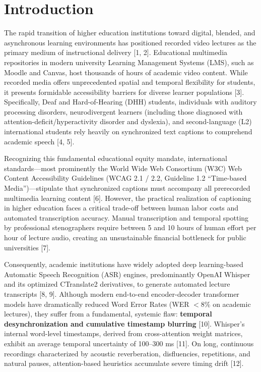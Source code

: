 \documentclass[12pt,a4paper]{article}
\begin{document}
\section{Introduction}
The rapid transition of higher education institutions toward digital, blended, and asynchronous learning environments has positioned recorded video lectures as the primary medium of instructional delivery [1, 2]. Educational multimedia repositories in modern university Learning Management Systems (LMS), such as Moodle and Canvas, host thousands of hours of academic video content. While recorded media offers unprecedented spatial and temporal flexibility for students, it presents formidable accessibility barriers for diverse learner populations [3]. Specifically, Deaf and Hard-of-Hearing (DHH) students, individuals with auditory processing disorders, neurodivergent learners (including those diagnosed with attention-deficit/hyperactivity disorder and dyslexia), and second-language (L2) international students rely heavily on synchronized text captions to comprehend academic speech [4, 5].

Recognizing this fundamental educational equity mandate, international standards---most prominently the World Wide Web Consortium (W3C) Web Content Accessibility Guidelines (WCAG 2.1 / 2.2, Guideline 1.2 ``Time-based Media'')---stipulate that synchronized captions must accompany all prerecorded multimedia learning content [6]. However, the practical realization of captioning in higher education faces a critical trade-off between human labor costs and automated transcription accuracy. Manual transcription and temporal spotting by professional stenographers require between 5 and 10 hours of human effort per hour of lecture audio, creating an unsustainable financial bottleneck for public universities [7].

Consequently, academic institutions have widely adopted deep learning-based Automatic Speech Recognition (ASR) engines, predominantly OpenAI Whisper and its optimized CTranslate2 derivatives, to generate automated lecture transcripts [8, 9]. Although modern end-to-end encoder-decoder transformer models have dramatically reduced Word Error Rates (WER $< 8\%$ on academic lectures), they suffer from a fundamental, systemic flaw: \textbf{temporal desynchronization and cumulative timestamp blurring} [10]. Whisper's internal word-level timestamps, derived from cross-attention weight matrices, exhibit an average temporal uncertainty of 100--300 ms [11]. On long, continuous recordings characterized by acoustic reverberation, disfluencies, repetitions, and natural pauses, attention-based heuristics accumulate severe timing drift [12].
\end{document}
